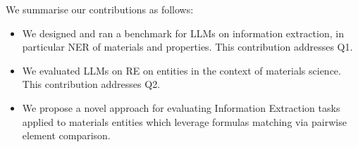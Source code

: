 \documentclass[a4paper]{article}
\begin{document}
We summarise our contributions as follows: 

\begin{itemize}
    \item We designed and ran a benchmark for LLMs on information extraction, in particular NER of materials and properties. This contribution addresses Q1. 
    \item We evaluated LLMs on RE on entities in the context of materials science. This contribution addresses Q2.
    \item We propose a novel approach for evaluating Information Extraction tasks applied to materials entities which leverage formulas matching via pairwise element comparison.
\end{itemize}






\end{document}
